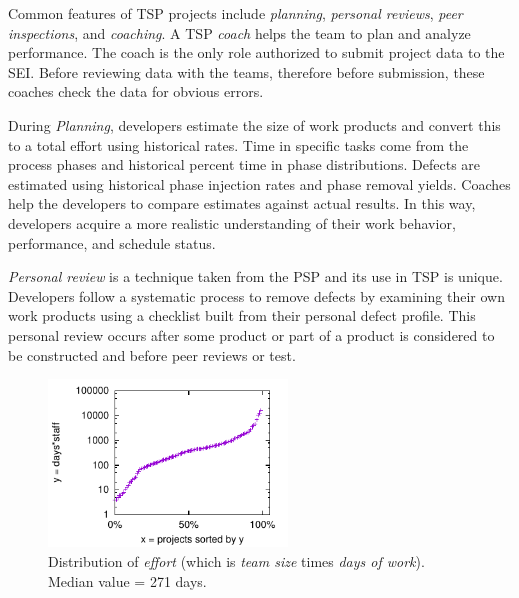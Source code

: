 Common features of TSP projects include {\em planning}, {\em personal reviews}, {\em peer inspections}, and {\em coaching}.
A TSP {\em coach} helps the team to plan and analyze performance. The coach is the only role authorized to submit project data to the SEI.
Before reviewing data with the teams, therefore before submission, these coaches check the data for obvious errors.

During {\em Planning}, developers estimate the size of work products and convert this to a total effort using historical rates. Time in specific tasks come from the  process phases and historical percent time in phase distributions. Defects are estimated using historical phase injection rates and phase removal yields. Coaches help the developers to compare estimates against actual results. In this way, developers acquire a more realistic understanding of their work behavior, performance, and schedule status.

{\em Personal review} is a technique taken from the PSP and its use in TSP is unique.  Developers follow a systematic process to remove defects by  examining their own work products using a checklist built from their personal defect profile. This personal review occurs after some product or part of a product is considered to be constructed and before peer reviews or test. 

  
 
 
\begin{figure}
\begin{center} \includegraphics[width=2.5in]{dom.pdf}
\end{center}
\caption{Distribution of 
{\em effort} (which is
{\em team size} times
{\em days of work}). Median
value = 271 days.}\label{fig:dist}
\end{figure}

